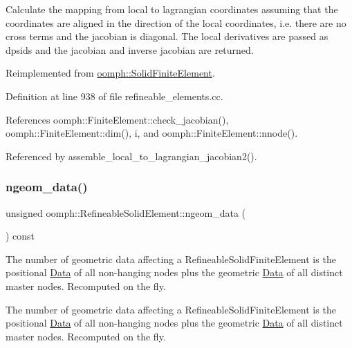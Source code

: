Calculate the mapping from local to lagrangian coordinates assuming that the coordinates are aligned in the direction of the local coordinates, i.\+e. there are no cross terms and the jacobian is diagonal. The local derivatives are passed as dpsids and the jacobian and inverse jacobian are returned. 

Reimplemented from \hyperlink{classoomph_1_1SolidFiniteElement_a811c926ab4ec81ecb374030302ef28ca}{oomph\+::\+Solid\+Finite\+Element}.



Definition at line 938 of file refineable\+\_\+elements.\+cc.



References oomph\+::\+Finite\+Element\+::check\+\_\+jacobian(), oomph\+::\+Finite\+Element\+::dim(), i, and oomph\+::\+Finite\+Element\+::nnode().



Referenced by assemble\+\_\+local\+\_\+to\+\_\+lagrangian\+\_\+jacobian2().

\mbox{\label{classoomph_1_1RefineableSolidElement_a690e24cdbd9308da1b9e705fd0340de8}} 
\subsubsection{\texorpdfstring{ngeom\+\_\+data()}{ngeom\_data()}}
{\footnotesize\ttfamily unsigned oomph\+::\+Refineable\+Solid\+Element\+::ngeom\+\_\+data (\begin{DoxyParamCaption}{ }\end{DoxyParamCaption}) const\hspace{0.3cm}{\ttfamily [virtual]}}



The number of geometric data affecting a Refineable\+Solid\+Finite\+Element is the positional \hyperlink{classoomph_1_1Data}{Data} of all non-\/hanging nodes plus the geometric \hyperlink{classoomph_1_1Data}{Data} of all distinct master nodes. Recomputed on the fly. 

The number of geometric data affecting a Refineable\+Solid\+Finite\+Element is the positional \hyperlink{classoomph_1_1Data}{Data} of all non-\/hanging nodes plus the geometric \hyperlink{classoomph_1_1Data}{Data} of all distinct master nodes. Recomputed on the fly. 

